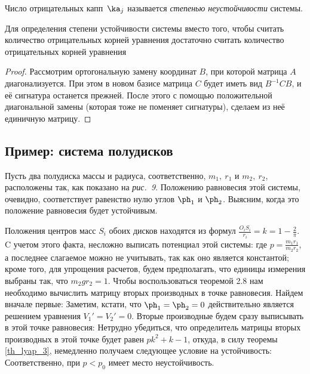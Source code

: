 \documentclass[a4paper,12pt]{article}
\newcommand{\tdf}[1]{\textsl{#1}}
\newcommand{\tpic}[1]{\emph{#1}}
\def\xtrpicturep#1#2{\vadjust{\vbox{%
\vskip.5pc
\centerline{\epsfbox{pictures.#1}}
\vskip2pt
\centerline{\footnotesize\normalfont\textbf{Рис.~#2}}
\vskip.5pc}}}
\begin{document}
\begin{df}
Число отрицательных капп~$\ka_j$ называется \tdf{степенью неустойчивости}
системы.
\end{df}
\begin{stm}
\label{stm::signature}
Для определения степени устойчивости системы вместо того, чтобы считать количество
отрицательных корней уравнения
достаточно считать количество отрицательных корней уравнения
\end{stm}
\begin{proof}
Рассмотрим ортогональную замену координат $B$, при которой матрица $A$ диагонализуется.
При этом в новом базисе матрица $C$ будет иметь вид $B^{-1} CB$, и её сигнатура останется
прежней. После этого с помощью положительной диагональной замены (которая тоже не поменяет сигнатуры),
сделаем из неё единичную матрицу.
\end{proof}

\subsection{Пример: система полудисков}

Пусть два полудиска массы и радиуса, соответственно, $m_1,\ r_1$ и
$m_2,\ r_2$, расположены так, как показано на \tpic{рис.~9}.
\xtrpicturep{9}{9}
Положению равновесия этой системы, очевидно, соответствует равенство
нулю углов $\ph_1$ и $\ph_2$. Выясним, когда это положение
равновесия будет устойчивым.

Положения центров масс $S_i$ обоих дисков находятся из формул
$\frac{O_iS_i}{r_i}=k=1-\frac{2}{\pi}.$ C учетом этого факта, несложно выписать потенциал этой
системы:
 где
$p=\frac{m_1r_1}{m_2r_2}$, а последнее слагаемое можно не учитывать, так как оно является
константой; кроме того, для упрощения расчетов, будем предполагать, что единицы измерения выбраны
так, что $m_2gr_2=1.$ Чтобы воспользоваться теоремой 2.8 нам необходимо вычислить матрицу вторых
производных в точке равновесия. Найдем вначале первые:
 Заметим, кстати, что
$\ph_1=\ph_2=0$ действительно является решением уравнения $V_1'=V_2'=0$. Вторые производные будем
сразу выписывать в этой точке равновесия:  Нетрудно убедиться, что
определитель матрицы вторых производных в этой точке будет равен $pk^2+k-1$, откуда, в силу теоремы
\ref{th_lyap_3}, немедленно получаем следующее условие на устойчивость:
\equ{p>p_0=\frac{1-k}{k^2}=\frac{2\pi}{(\pi-2)^2}.} Соответственно, при $p<p_0$ имеет место
неустойчивость.
\end{document}
